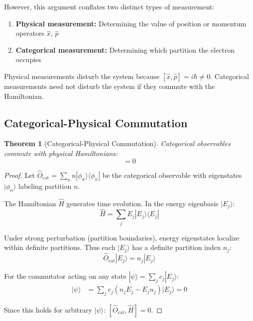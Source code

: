 \documentclass[aps,prl,twocolumn,superscriptaddress,floatfix]{revtex4-2}
\newtheorem{theorem}{Theorem}
\begin{document}
However, this argument conflates two distinct types of measurement:
\begin{enumerate}
\item \textbf{Physical measurement:} Determining the value of position or momentum operators $\hat{x}$, $\hat{p}$
\item \textbf{Categorical measurement:} Determining which partition the electron occupies
\end{enumerate}

Physical measurements disturb the system because $[\hat{x}, \hat{p}] = i\hbar \neq 0$. Categorical measurements need not disturb the system if they commute with the Hamiltonian.

\subsection{Categorical-Physical Commutation}

\begin{theorem}[Categorical-Physical Commutation]
Categorical observables commute with physical Hamiltonians:
\begin{equation}
[\hat{O}_{\text{cat}}, \hat{H}] = 0
\end{equation}
\end{theorem}

\begin{proof}
Let $\hat{O}_{\text{cat}} = \sum_n n |\phi_n\rangle\langle\phi_n|$ be the categorical observable with eigenstates $|\phi_n\rangle$ labeling partition $n$.

The Hamiltonian $\hat{H}$ generates time evolution. In the energy eigenbasis $|E_j\rangle$:
\begin{equation}
\hat{H} = \sum_j E_j |E_j\rangle\langle E_j|
\end{equation}

Under strong perturbation (partition boundaries), energy eigenstates localize within definite partitions. Thus each $|E_j\rangle$ has a definite partition index $n_j$:
\begin{equation}
\hat{O}_{\text{cat}} |E_j\rangle = n_j |E_j\rangle
\end{equation}

For the commutator acting on any state $|\psi\rangle = \sum_j c_j |E_j\rangle$:
\begin{align}
[\hat{O}_{\text{cat}}, \hat{H}]|\psi\rangle &= \sum_j c_j (n_j E_j - E_j n_j)|E_j\rangle = 0
\end{align}

Since this holds for arbitrary $|\psi\rangle$: $[\hat{O}_{\text{cat}}, \hat{H}] = 0$.
\end{proof}
\end{document}
